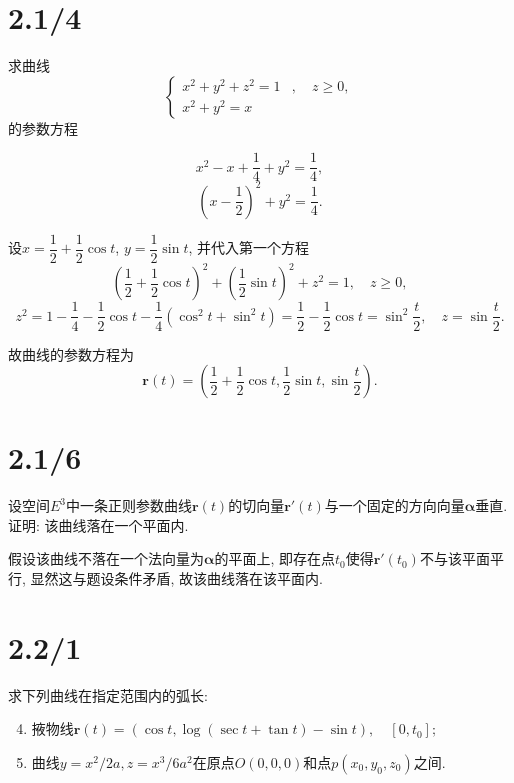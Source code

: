 \documentclass[11pt,a4paper]{article}
\author{刘逸灏 (515370910207)}
\begin{document}
\maketitle

\section{2.1/4}
\begin{problem}
  求曲线
  $$
    \left\{
    \begin{aligned}
      x^2+y^2+z^2=1 & ,\quad z\geqslant0, \\
      x^2+y^2=x     &
    \end{aligned}
    \right.
  $$
  的参数方程
\end{problem}

$$x^2-x+\frac{1}{4}+y^2=\frac{1}{4},$$
$$\left(x-\frac{1}{2}\right)^2+y^2=\frac{1}{4}.$$

设$x=\dfrac{1}{2}+\dfrac{1}{2}\cos t$, $y=\dfrac{1}{2}\sin t$, 并代入第一个方程
$$\left(\frac{1}{2}+\frac{1}{2}\cos t\right)^2+\left(\frac{1}{2}\sin t\right)^2+z^2=1,\quad z\geqslant0,$$
$$z^2=1-\frac{1}{4}-\frac{1}{2}\cos t-\frac{1}{4}(\cos^2t+\sin^2t)=\frac{1}{2}-\frac{1}{2}\cos t=\sin^2\frac{t}{2},\quad z=\sin\frac{t}{2}.$$

故曲线的参数方程为
$$\mathbf{r}(t)=\left(\frac{1}{2}+\frac{1}{2}\cos t,\frac{1}{2}\sin t,\sin\frac{t}{2}\right).$$

\section{2.1/6}
\begin{problem}
  设空间$E^3$中一条正则参数曲线$\mathbf{r}(t)$的切向量$\mathbf{r}'(t)$与一个固定的方向向量$\boldsymbol\alpha$垂直. 证明: 该曲线落在一个平面内.
\end{problem}

假设该曲线不落在一个法向量为$\boldsymbol\alpha$的平面上, 即存在点$t_0$使得$\mathbf{r}'(t_0)$不与该平面平行, 显然这与题设条件矛盾, 故该曲线落在该平面内.

\section{2.2/1}
\begin{problem}
  求下列曲线在指定范围内的弧长:
  \begin{enumerate}
    \setcounter{enumi}{3}
    \item 掖物线$\mathbf{r}(t)=(\cos t, \log(\sec t+\tan t)-\sin t),\quad [0,t_0];$
    \item 曲线$y=x^2/2a,z=x^3/6a^2$在原点$O(0,0,0)$和点$p(x_0,y_0,z_0)$之间.
  \end{enumerate}
\end{problem}
\end{document}
